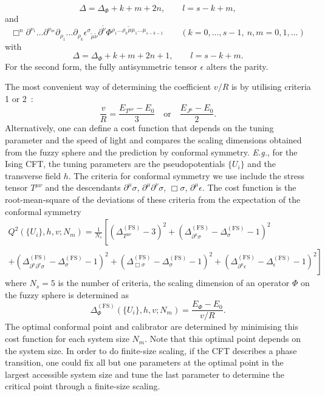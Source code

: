 \documentclass{timesjhep}
\begin{document}
\begin{enumerate}
\begin{equation*}
        \Delta=\Delta_\Phi+k+m+2n,\qquad l=s-k+m,
    \end{equation*}
    and
    \begin{equation*}
        \Box^n\partial^{\nu_1}\dots\partial^{\nu_m}\partial_{\rho_1}\dots\partial_{\rho_k}\epsilon^{\sigma}{}_{\tilde{\mu}\tilde{\nu}}\partial^{\tilde{\nu}}\Phi^{\rho_1\dots\rho_{k}\tilde{\mu}\mu_1\dots \mu_{s-k-1}}\qquad (k=0,\dots,s-1,\ n,m=0,1,\dots)
    \end{equation*}
    with
    \begin{equation*}
        \Delta=\Delta_\Phi+k+m+2n+1,\qquad l=s-k+m.
    \end{equation*}
    For the second form, the fully antisymmetric tensor $\epsilon$ alters the parity.
\end{enumerate}

The most convenient way of determining the coefficient $v/R$ is by utilising criteria 1 or 2~:
\begin{equation}
    \frac{v}{R}=\frac{E_{T^{\mu\nu}}-E_0}{3}\quad\textrm{or}\quad\frac{E_{J^\mu}-E_0}{2}.
\end{equation}
Alternatively, one can define a cost function that depends on the tuning parameter and the speed of light and compares the scaling dimensions obtained from the fuzzy sphere and the prediction by conformal symmetry. \textit{E.g.}, for the Ising CFT, the tuning parameters are the pseudopotentials $\{U_i\}$ and the transverse field $h$. The criteria for conformal symmetry we use include the stress tensor $T^{\mu\nu}$ and the descendants $\partial^\mu\sigma$, $\partial^\mu\partial^\nu\sigma$, $\Box\sigma$, $\partial^\mu\epsilon$. The cost function is the root-mean-square of the deviations of these criteria from the expectation of the conformal symmetry
\begin{multline}
    Q^2(\{U_i\},h,v;N_m)=\frac{1}{N_s}\left[(\Delta_{T^{\mu\nu}}^{(\textrm{FS})}-3)^2+(\Delta_{\partial^\mu\sigma}^{(\textrm{FS})}-\Delta_\sigma^{(\textrm{FS})}-1)^2\right.\\
    \left.+(\Delta_{\partial^\mu\partial^\nu\sigma}^{(\textrm{FS})}-\Delta_\sigma^{(\textrm{FS})}-1)^2+(\Delta_{\Box\sigma}^{(\textrm{FS})}-\Delta_\sigma^{(\textrm{FS})}-1)^2+(\Delta_{\partial^\mu\epsilon}^{(\textrm{FS})}-\Delta_\epsilon^{(\textrm{FS})}-1)^2\right]
\end{multline}
where $N_s=5$ is the number of criteria, the scaling dimension of an operator $\Phi$ on the fuzzy sphere is determined as
\begin{equation}
    \Delta_\Phi^{(\textrm{FS})}(\{U_i\},h,v;N_m)=\frac{E_\Phi-E_0}{v/R}.
\end{equation}
The optimal conformal point and calibrator are determined by minimising this cost function for each system size $N_m$. Note that this optimal point depends on the system size. In order to do finite-size scaling, if the CFT describes a phase transition, one could fix all but one parameters at the optimal point in the largest accessible system size and tune the last parameter to determine the critical point through a finite-size scaling.
\end{document}
